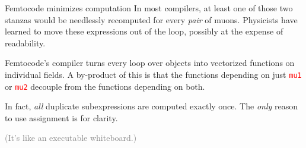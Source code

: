 \documentclass{beamer}
\begin{document}
\begin{frame}{Femtocode minimizes computation}
In most compilers, at least one of those two stanzas would be needlessly recomputed for every {\it pair} of muons. Physicists have learned to move these expressions out of the loop, possibly at the expense of readability.

\vfill
Femtocode's compiler turns every loop over objects into vectorized functions on individual fields. A by-product of this is that the functions depending on just \textcolor{red}{\tt mu1} or \textcolor{red}{\tt mu2} decouple from the functions depending on both.

\vfill
In fact, {\it all} duplicate subexpressions are computed exactly once. The {\it only} reason to use assignment is for clarity.

\vfill
\textcolor{gray}{(It's like an executable whiteboard.)}
\end{frame}
\end{document}

